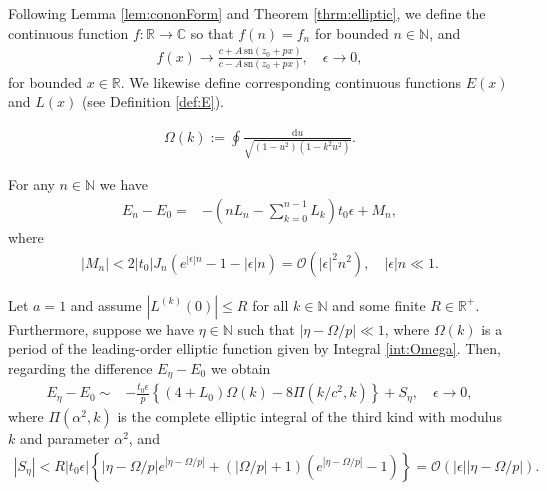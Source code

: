 \documentclass[10pt,a4paper]{amsart}
\begin{document}
\begin{definition}\label{def:cont}
    Following Lemma \ref{lem:cononForm} and Theorem \ref{thrm:elliptic}, we define the continuous function $f:\mathbb{R}\rightarrow\mathbb{C}$ so that $f(n)=f_n$ for bounded $n\in\mathbb{N}$, and
    \begin{align*}
        f(x)\to\frac{c+A\,\text{sn}(z_0+px)}{c-A\,\text{sn}(z_0+px)},\quad\epsilon\rightarrow0,
    \end{align*}
    for bounded $x\in\mathbb{R}$. We likewise define corresponding continuous functions $E(x)$ and $L(x)$ (see Definition \ref{def:E}).
\end{definition}

        \begin{align}\label{int:Omega}
        \Omega(k):=\oint\frac{\text{d}u}{\sqrt{(1-u^2)(1-k^2u^2)}}.
    \end{align}

\begin{lemma}\label{lem:diffEn0}
    For any $n\in\mathbb{N}$ we have
    \begin{align}\label{eq:difference}
        E_n-E_{0}=&-\left(nL_n-\sum_{k=0}^{n-1}L_k\right)t_0\epsilon+M_n,
    \end{align}
    where
    \begin{align*}
        |M_n|<2|t_0|J_n\left(e^{|\epsilon|n}-1-|\epsilon|n\right)=\mathcal{O}\left(|\epsilon|^2n^2\right),\quad|\epsilon|n\ll1.
    \end{align*}
\end{lemma}

\begin{theorem}\label{thrm:main2}
    Let $a=1$ and assume $|L^{(k)}(0)|\leq R$ for all $k\in\mathbb{N}$ and some finite $R\in\mathbb{R}^+$. Furthermore, suppose we have $\eta\in\mathbb{N}$ such that $|\eta-\Omega/p|\ll1$, where $\Omega(k)$ is a period of the leading-order elliptic function given by Integral \eqref{int:Omega}. Then, regarding the difference $E_\eta-E_0$ we obtain
    \begin{align*}
        E_\eta-E_{0}\sim&-\frac{t_0\epsilon}{p}\left\{(4+L_0)\Omega(k)-8\Pi(k/c^2,k)\right\}+S_\eta,\quad\epsilon\to0,
    \end{align*}
    where $\Pi(\alpha^2,k)$ is the complete elliptic integral of the third kind with modulus $k$ and parameter $\alpha^2$, and
    \begin{align*}
        |S_\eta|<R|t_0\epsilon|\left\{|\eta-\Omega/p|e^{|\eta-\Omega/p|}+\left(\left|\Omega/p\right|+1\right)\left(e^{|\eta-\Omega/p|}-1\right)\right\}=\mathcal{O}\left(|\epsilon||\eta-\Omega/p|\right).
    \end{align*}
\end{theorem}
\end{document}
